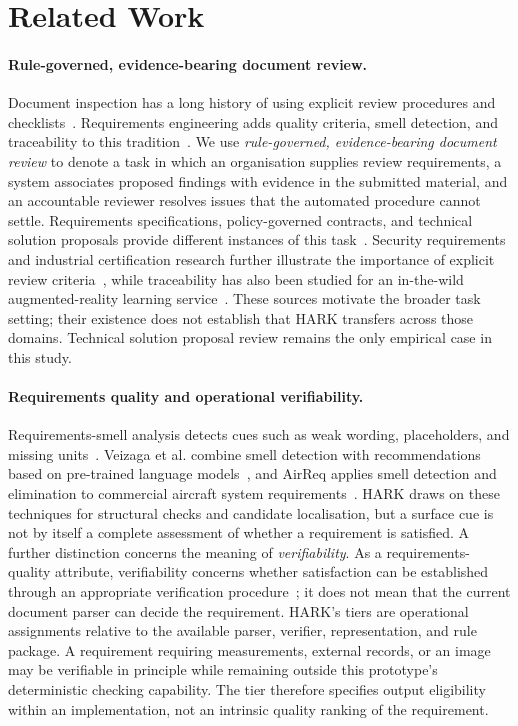 \section{Related Work}

\paragraph{Rule-governed, evidence-bearing document review.}
Document inspection has a long history of using explicit review procedures and checklists~\cite{fagan1976,lait2000}. Requirements engineering adds quality criteria, smell detection, and traceability to this tradition~\cite{iso29148,genova2013,femmer2017}. We use \emph{rule-governed, evidence-bearing document review} to denote a task in which an organisation supplies review requirements, a system associates proposed findings with evidence in the submitted material, and an accountable reviewer resolves issues that the automated procedure cannot settle. Requirements specifications, policy-governed contracts, and technical solution proposals provide different instances of this task~\cite{chinnam2025,alsawalqah2026,malik2026}. Security requirements and industrial certification research further illustrate the importance of explicit review criteria~\cite{secreq2025,cyberreq2026}, while traceability has also been studied for an in-the-wild augmented-reality learning service~\cite{trace2026}. These sources motivate the broader task setting; their existence does not establish that HARK transfers across those domains. Technical solution proposal review remains the only empirical case in this study.

\paragraph{Requirements quality and operational verifiability.}
Requirements-smell analysis detects cues such as weak wording, placeholders, and missing units~\cite{femmer2017}. Veizaga et al. combine smell detection with recommendations based on pre-trained language models~\cite{smell2024}, and AirReq applies smell detection and elimination to commercial aircraft system requirements~\cite{airreq2025}. HARK draws on these techniques for structural checks and candidate localisation, but a surface cue is not by itself a complete assessment of whether a requirement is satisfied. A further distinction concerns the meaning of \emph{verifiability}. As a requirements-quality attribute, verifiability concerns whether satisfaction can be established through an appropriate verification procedure~\cite{iso29148,genova2013}; it does not mean that the current document parser can decide the requirement. HARK's tiers are operational assignments relative to the available parser, verifier, representation, and rule package. A requirement requiring measurements, external records, or an image may be verifiable in principle while remaining outside this prototype's deterministic checking capability. The tier therefore specifies output eligibility within an implementation, not an intrinsic quality ranking of the requirement.

